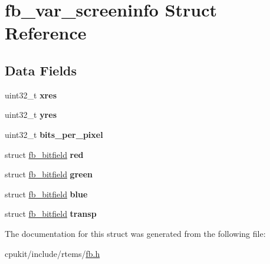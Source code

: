 \hypertarget{structfb__var__screeninfo}{}\section{fb\+\_\+var\+\_\+screeninfo Struct Reference}
\label{structfb__var__screeninfo}
\subsection*{Data Fields}
\begin{DoxyCompactItemize}
\item 
\mbox{\label{structfb__var__screeninfo_a7910f9f5ebbd980c786bd78e150bf566}} 
uint32\+\_\+t {\bfseries xres}
\item 
\mbox{\label{structfb__var__screeninfo_a735b9efc7bac06df00381ca6c26495ad}} 
uint32\+\_\+t {\bfseries yres}
\item 
\mbox{\label{structfb__var__screeninfo_a016ff47aeb2bec45d2f4c1966d1333f0}} 
uint32\+\_\+t {\bfseries bits\+\_\+per\+\_\+pixel}
\item 
\mbox{\label{structfb__var__screeninfo_a5dba7c2e5f6997c1c58f61cd4bb7e4bf}} 
struct \mbox{\hyperlink{structfb__bitfield}{fb\+\_\+bitfield}} {\bfseries red}
\item 
\mbox{\label{structfb__var__screeninfo_a9833949668fa64f31d1e145307817542}} 
struct \mbox{\hyperlink{structfb__bitfield}{fb\+\_\+bitfield}} {\bfseries green}
\item 
\mbox{\label{structfb__var__screeninfo_a31a26814ea828584debac212337a3806}} 
struct \mbox{\hyperlink{structfb__bitfield}{fb\+\_\+bitfield}} {\bfseries blue}
\item 
\mbox{\label{structfb__var__screeninfo_a61d4784b3011538ed42dd54e0673b9a2}} 
struct \mbox{\hyperlink{structfb__bitfield}{fb\+\_\+bitfield}} {\bfseries transp}
\end{DoxyCompactItemize}


The documentation for this struct was generated from the following file\+:\begin{DoxyCompactItemize}
\item 
cpukit/include/rtems/\mbox{\hyperlink{fb_8h}{fb.\+h}}\end{DoxyCompactItemize}
